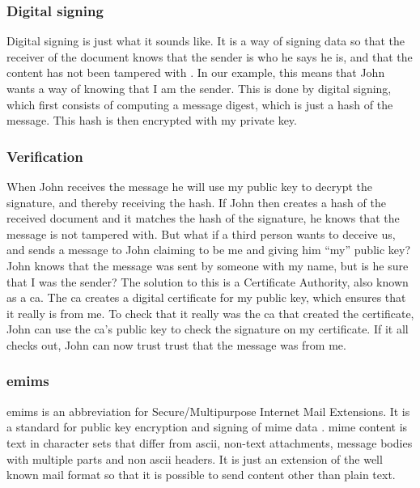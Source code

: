 \subsubsection{Digital signing}
Digital signing is just what it sounds like. It is a way of signing data so that the receiver of the document knows that the sender is who he says he is, and that the content has not been tampered with \cite{bib:ds}. In our example, this means that John wants a way of knowing that I am the sender. This is done by digital signing, which first consists of computing a message digest, which is just a hash of the message. This hash is then encrypted with my private key.


\subsubsection{Verification}
When John receives the message he will use my public key to decrypt the signature, and thereby receiving the hash. If John then creates a hash of the received document and it matches the hash of the signature, he knows that the message is not tampered with. 
\newline
\newline
But what if a third person wants to deceive us, and sends a message to John claiming to be me and giving him “my” public key? John knows that the message was sent by someone with my name, but is he sure that I was the sender? The solution to this is a Certificate Authority, also known as a \gls{ca}. The \gls{ca} creates a digital certificate for my public key, which ensures that it really is from me. To check that it really was the \gls{ca} that created the certificate, John can use the \gls{ca}'s public key to check the signature on my certificate. If it all checks out, John can now trust trust that the message was from me.

\subsubsection{\gls{emims}}
\gls{emims} is an abbreviation for Secure/Multipurpose Internet Mail Extensions. It is a standard for public key encryption and signing of \gls{mime} data \cite{bib:smime}. \gls{mime} content is text in character sets that differ from \gls{ascii}, non-text attachments, message bodies with multiple parts and non \gls{ascii} headers. It is just an extension of the well known mail format so that it is possible to send content other than plain text.

